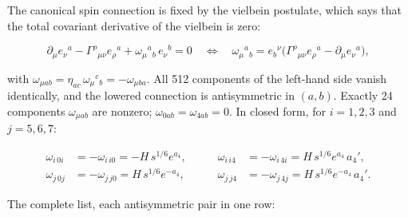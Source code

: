 \documentclass[11pt]{article}
\begin{document}
The canonical spin connection is fixed by the vielbein postulate, which says that the total covariant derivative of the vielbein is zero:

\[
\partial_\mu e_\nu{}^a-\Gamma^\rho{}_{\mu\nu}e_\rho{}^a+\omega_\mu{}^a{}_b\,e_\nu{}^b=0
\quad\Longleftrightarrow\quad
\omega_\mu{}^a{}_b=e_b{}^\nu\bigl(\Gamma^\rho{}_{\mu\nu}e_\rho{}^a-\partial_\mu e_\nu{}^a\bigr),
\]

with $\omega_{\mu ab}=\eta_{ac}\,\omega_\mu{}^c{}_b=-\omega_{\mu ba}$. All 512 components of the left-hand side vanish identically, and the lowered connection is antisymmetric in $(a,b)$. Exactly 24 components $\omega_{\mu ab}$ are nonzero; $\omega_{0ab}=\omega_{4ab}=0$. In closed form, for $i=1,2,3$ and $j=5,6,7$:

\[
\begin{aligned}
\omega_{i\,0i}&=-\omega_{i\,i0}=-H\,s^{1/6}e^{a_4}, &\qquad \omega_{i\,i4}&=-\omega_{i\,4i}=H\,s^{1/6}e^{a_4}\,a_4',\\
\omega_{j\,0j}&=-\omega_{j\,j0}=H\,s^{1/6}e^{-a_4}, &\qquad \omega_{j\,j4}&=-\omega_{j\,4j}=H\,s^{1/6}e^{-a_4}\,a_4'.
\end{aligned}
\]

The complete list, each antisymmetric pair in one row:
\end{document}

